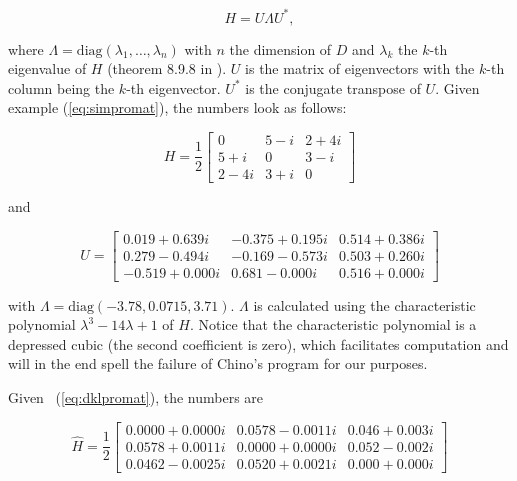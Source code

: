 \documentclass[phd,12pt,oneside]{ubcthesis}
\begin{document}
\begin{equation}
  \label{eq:unitary}
  H=U\Lambda{}U^{*},
\end{equation}

{\noindent}where $\Lambda=\mbox{diag}(\lambda_{1},\ldots,\lambda_{n})$ with $n$
the dimension of $D$ and $\lambda_{k}$ the $k$-th eigenvalue of $H$
(theorem 8.9.8 in ). $U$ is the matrix of
eigenvectors with the $k$-th column being the $k$-th eigenvector.
$U^{*}$ is the conjugate transpose of $U$. Given example
(\ref{eq:simpromat}), the numbers look as follows:

\begin{equation}
  \label{eq:simh}
H=\frac{1}{2}\left[
      \begin{array}{ccc}
        0 & 5-i & 2+4i \\
        5+i & 0 & 3-i \\
        2-4i & 3+i & 0 
      \end{array}
\right]
\end{equation}

{\noindent}and

\begin{equation}
  \label{eq:simu}
U=\left[
      \begin{array}{ccc}
   0.019 + 0.639i & -0.375 + 0.195i &  0.514 + 0.386i \\
   0.279 - 0.494i & -0.169 - 0.573i &  0.503 + 0.260i \\
  -0.519 + 0.000i &  0.681 - 0.000i &  0.516 + 0.000i
      \end{array}
\right]
\end{equation}

{\noindent}with $\Lambda=\mbox{diag}(-3.78,0.0715,3.71)$. $\Lambda$ is
calculated using the characteristic polynomial
$\lambda^{3}-14\lambda+1$ of $H$. Notice that the characteristic
polynomial is a depressed cubic (the second coefficient is zero),
which facilitates computation and will in the end spell the failure of
Chino's program for our purposes.

Given {\xample}~(\ref{eq:dklpromat}), the numbers are
 
\begin{equation}
  \label{eq:dklh}
\hat{H}=\frac{1}{2}\left[
      \begin{array}{ccc}
   0.0000 + 0.0000i &  0.0578 - 0.0011i &  0.046 + 0.003i \\
   0.0578 + 0.0011i &  0.0000 + 0.0000i &  0.052 - 0.002i \\
   0.0462 - 0.0025i &  0.0520 + 0.0021i &  0.000 + 0.000i
      \end{array}
\right]
\end{equation}
\end{document}
